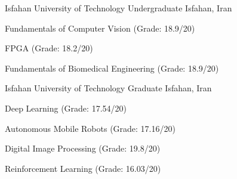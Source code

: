 

\begin{cventries}



      \cventry
    {Isfahan University of Technology} %
    {Undergraduate} %
    {Isfahan, Iran} %
    { } %
    {
      \begin{cvitems} %
        \item {Fundamentals of Computer Vision (Grade: 18.9/20)}
        \item {FPGA (Grade: 18.2/20)}
        \item {Fundamentals of Biomedical Engineering (Grade: 18.9/20)}
      \end{cvitems}
    }
    
  \cventry
    {Isfahan University of Technology} %
    {Graduate} %
    {Isfahan, Iran} %
    { } %
    {
      \begin{cvitems} %
        \item {Deep Learning (Grade: 17.54/20)}
        \item {Autonomous Mobile Robots (Grade: 17.16/20)}
        \item {Digital Image Processing (Grade: 19.8/20)}
        \item {Reinforcement Learning (Grade: 16.03/20)}
      \end{cvitems}
    }






\end{cventries}
